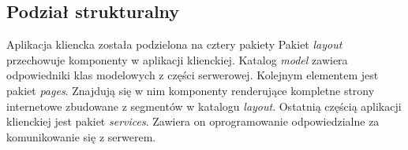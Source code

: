 \documentclass[12pt, twoside]{report}
\begin{document}
\subsection{Podział strukturalny}
Aplikacja kliencka została  podzielona na cztery pakiety 
Pakiet \textit{layout} przechowuje komponenty w aplikacji klienckiej. Katalog \textit{model} zawiera odpowiedniki klas modelowych z części serwerowej. Kolejnym elementem jest pakiet \textit{pages}. Znajdują się w nim komponenty renderujące kompletne strony internetowe zbudowane z segmentów  w katalogu \textit{layout}. Ostatnią częścią aplikacji klienckiej jest pakiet \textit{services}. Zawiera on oprogramowanie odpowiedzialne za komunikowanie się z serwerem. 
\end{document}
